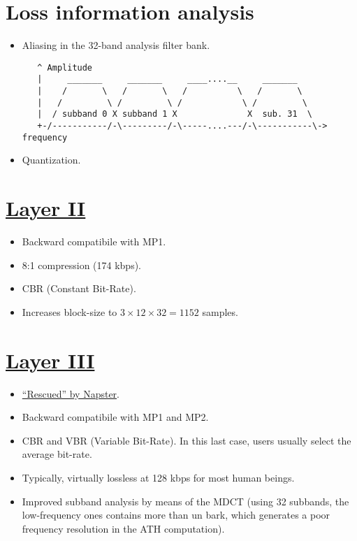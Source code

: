 \section{Loss information analysis}
\begin{itemize}
  \tightlist
\item Aliasing in the 32-band analysis filter bank.
\begin{verbatim}
   ^ Amplitude
   |     _______     _______     ____....__     _______
   |    /       \   /       \   /          \   /       \
   |   /         \ /         \ /            \ /         \
   |  / subband 0 X subband 1 X              X  sub. 31  \
   +-/-----------/-\---------/-\-----....---/-\-----------\-> frequency
\end{verbatim}
\item Quantization.
\end{itemize}

\section{\href{https://en.wikipedia.org/wiki/MPEG-1_Audio_Layer_II)}{Layer II}}
\begin{itemize}
\item Backward compatibile with MP1.
\item 8:1 compression (174 kbps).
\item CBR (Constant Bit-Rate).
\item Increases block-size to $3\times 12\times 32=1152$ samples.
\end{itemize}

\section{\href{https://en.wikipedia.org/wiki/MP3}{Layer III}}
\begin{itemize}
\item \href{https://www.xataka.com/historia-tecnologica/la-historia-del-mp3-el-formato-que-tras-casi-morir-dos-veces-revoluciono-el-mundo-de-la-musica}{``Rescued'' by Napster}.
\item Backward compatibile with MP1 and MP2.
\item CBR and VBR (Variable Bit-Rate). In this last case, users
  usually select the average bit-rate.
\item Typically, virtually lossless at 128 kbps for most human beings.
\item Improved subband analysis by means of the MDCT (using 32
  subbands, the low-frequency ones contains more than un bark, which
  generates a poor frequency resolution in the ATH computation).
\end{itemize}

